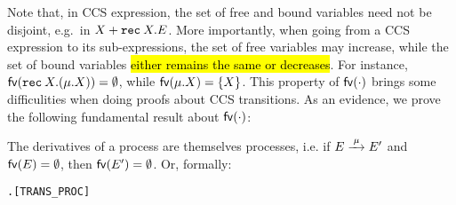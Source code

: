 Note that, in CCS expression, the set of free and bound
variables need not be disjoint, e.g.\ in  $X + {\tt rec}\: X . E$.
More importantly, when going
from a CCS expression to its sub-expressions, the set of free
variables may increase, while the set of bound variables \hl{either
remains the same or decreases}. For instance, ${{\rm\sf{fv}}}({\tt rec}\: X . (\mu.X)) = \emptyset$, while
${{\rm\sf{fv}}}(\mu.X) = \{X\}$. This property of ${{\rm\sf{fv}}}(\cdot)$ brings some
difficulities when doing proofs about CCS transitions. As an evidence,
we prove the following fundamental result about ${{\rm\sf{fv}}}(\cdot)$:

\begin{proposition}
\label{prop:transFV}
The derivatives of a process are themselves processes, i.e.
if $E \arr{\mu} E'$ and ${{\rm\sf{fv}}}(E) = \emptyset$, then ${{\rm\sf{fv}}}(E') =
\emptyset$. Or, formally:
\begin{alltt}
\HOLTokenTurnstile{} \HOLSymConst{\HOLTokenForall{}}  .  \HOLTokenTransBegin{}\HOLTokenTransEnd {} \HOLSymConst{\HOLTokenConj{}}   \HOLSymConst{\HOLTokenImp{}}  \hfill{[TRANS_PROC]}
\end{alltt}
\end{proposition}

